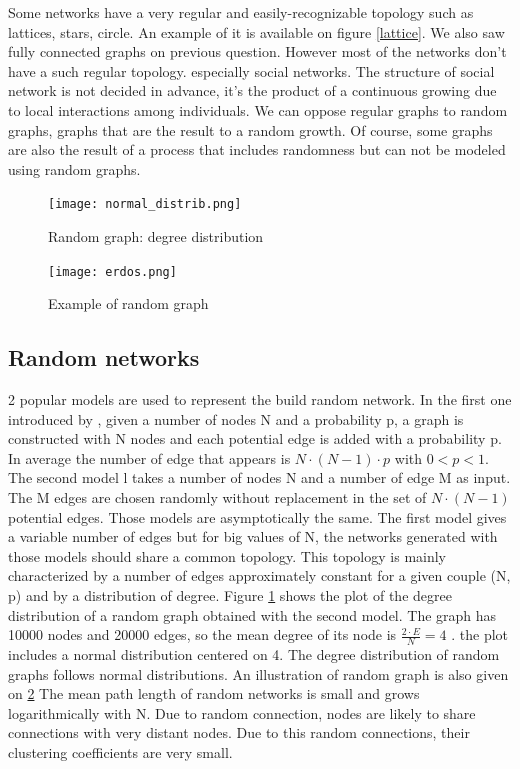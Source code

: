 \documentclass[a4paper, 12pt]{report}
\begin{document}
Some networks have a very regular and easily-recognizable topology such as lattices, stars, circle. An example of it is available on figure \ref{lattice}. We also saw fully connected graphs on previous question. However most of the networks don't have a such regular topology. especially social networks. The structure of social network is not decided in advance, it's the product of a continuous growing due to local interactions among individuals. We can oppose regular graphs to random graphs, graphs that are the result to a random growth. Of course, some graphs are also the result of a process that includes randomness but can not be modeled using random graphs.\\
\begin{figure}
\centering
\texttt{[image: normal\_distrib.png]}
\caption{Random graph: degree distribution}
\label{random}
\end{figure}

\begin{figure}
\centering
\texttt{[image: erdos.png]}
\caption{Example of random graph\citep{erdos_image}}
\label{erdos}
\end{figure}

\subsection{Random networks}
2 popular models are used to represent the build random network. In the first one introduced by \cite{erdosRandom}, given a number of nodes N and a probability p, a graph is constructed with N nodes and each potential edge is added with a probability p. In average the number of edge that appears is $N \cdot (N-1) \cdot p$ with $ 0< p <1$. The second model \citep{gilbertRandom} l takes a number of nodes N and a number of edge M as input. The M edges are chosen randomly without replacement in the set of $N \cdot (N-1)$ potential edges. Those models are asymptotically the same. The first model gives a variable number of edges but for big values of N, the networks generated with those models should share a common topology. This topology is mainly characterized by a number of edges approximately constant for a given couple (N, p) and by a distribution of degree. Figure \ref{random} shows the plot of the degree distribution of a random graph obtained with the second model. The graph has 10000 nodes and 20000 edges, so the mean degree of its node is  $\frac{2 \cdot E}{N} = 4$ . the plot includes a normal distribution centered on 4. The degree distribution of random graphs follows normal distributions.  An illustration of random graph is also given on \ref{erdos} The mean path length of random networks is small and grows logarithmically with N. Due to random connection, nodes are likely to share connections with very distant nodes. Due to this random connections, their clustering coefficients are very small.\\
\end{document}
